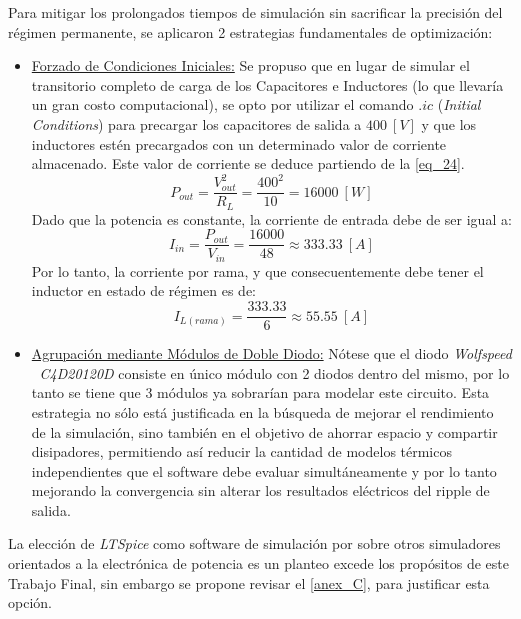 \documentclass[12pt,a4paper]{article}
\begin{document}
Para mitigar los prolongados tiempos de simulación sin sacrificar la precisión del régimen permanente, se aplicaron 2 estrategias fundamentales de optimización:
\begin{itemize}
    \item \underline{Forzado de Condiciones Iniciales:} Se propuso que en lugar de simular el transitorio completo de carga de los Capacitores e Inductores (lo que llevaría un gran costo computacional), se opto por utilizar el comando $.ic$ (\textit{Initial Conditions}) para precargar los capacitores de salida a $400 \ [V]$ y que los inductores estén precargados con un determinado valor de corriente almacenado. Este valor de corriente se deduce partiendo de la \autoref{eq_24}.
    \begin{equation}
        P_{out} = \frac{V_{out}^{2}}{R_{L}} = \frac{400^2}{10} = 16000 \ [W]
        \label{eq_25}
    \end{equation}
    Dado que la potencia es constante, la corriente de entrada debe de ser igual a:
    \begin{equation}
        I_{in} = \frac{P_{out}}{V_{in}} = \frac{16000}{48} \approx 333.33 \ [A]
        \label{eq_26}
    \end{equation}
    Por lo tanto, la corriente por rama, y que consecuentemente debe tener el inductor en estado de régimen es de:
    \begin{equation}
        I_{L(rama)} = \frac{333.33}{6} \approx 55.55 \ [A]
        \label{eq_27}
    \end{equation}


    \item \underline{Agrupación mediante Módulos de Doble Diodo:} Nótese que el diodo \textit{Wolfspeed} $\ $ \textit{C4D20120D} consiste en único módulo con 2 diodos dentro del mismo, por lo tanto se tiene que 3 módulos ya sobrarían para modelar este circuito. Esta estrategia no sólo está justificada en la búsqueda de mejorar el rendimiento de la simulación, sino también en el objetivo de ahorrar espacio y compartir disipadores, permitiendo así reducir la cantidad de modelos térmicos independientes que el software debe evaluar simultáneamente y por lo tanto mejorando la convergencia sin alterar los resultados eléctricos del ripple de salida.
\end{itemize}

La elección de \textit{LTSpice} como software de simulación por sobre otros simuladores orientados a la electrónica de potencia es un planteo excede los propósitos de este Trabajo Final, sin embargo se propone revisar el \autoref{anex_C}, para justificar esta opción.
\end{document}
